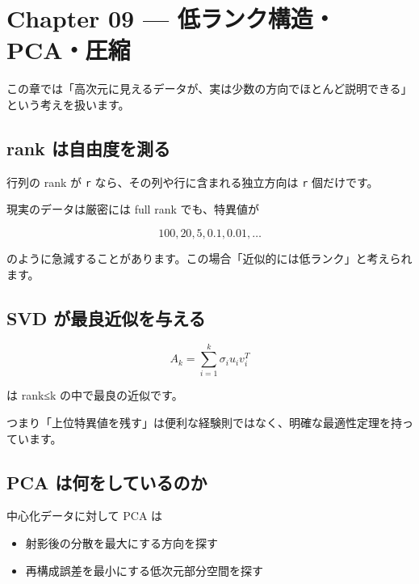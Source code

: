 \documentclass[
  11pt,
  a4paper,
]{ltjsarticle}
\author{}
\date{}
\providecommand{\tightlist}{%
  \setlength{\itemsep}{0pt}\setlength{\parskip}{0pt}}
\begin{document}
\hypertarget{chapter-09-ux4f4eux30e9ux30f3ux30afux69cbux9020pcaux5727ux7e2e}{%
\section{Chapter 09 ---
低ランク構造・PCA・圧縮}\label{chapter-09-ux4f4eux30e9ux30f3ux30afux69cbux9020pcaux5727ux7e2e}}

この章では「高次元に見えるデータが、実は少数の方向でほとんど説明できる」という考えを扱います。

\hypertarget{rank-ux306fux81eaux7531ux5ea6ux3092ux6e2cux308b}{%
\subsection{rank
は自由度を測る}\label{rank-ux306fux81eaux7531ux5ea6ux3092ux6e2cux308b}}

行列の rank が \texttt{r} なら、その列や行に含まれる独立方向は
\texttt{r} 個だけです。

現実のデータは厳密には full rank でも、特異値が

\[
100,20,5,0.1,0.01,\dots
\]

のように急減することがあります。この場合「近似的には低ランク」と考えられます。

\hypertarget{svd-ux304cux6700ux826fux8fd1ux4f3cux3092ux4e0eux3048ux308b}{%
\subsection{SVD
が最良近似を与える}\label{svd-ux304cux6700ux826fux8fd1ux4f3cux3092ux4e0eux3048ux308b}}

\[
A_k=\sum_{i=1}^k\sigma_iu_iv_i^T
\]

は rank≤k の中で最良の近似です。

つまり「上位特異値を残す」は便利な経験則ではなく、明確な最適性定理を持っています。

\hypertarget{pca-ux306fux4f55ux3092ux3057ux3066ux3044ux308bux306eux304b}{%
\subsection{PCA
は何をしているのか}\label{pca-ux306fux4f55ux3092ux3057ux3066ux3044ux308bux306eux304b}}

中心化データに対して PCA は

\begin{itemize}
\tightlist
\item
  射影後の分散を最大にする方向を探す
\item
  再構成誤差を最小にする低次元部分空間を探す
\end{itemize}
\end{document}
